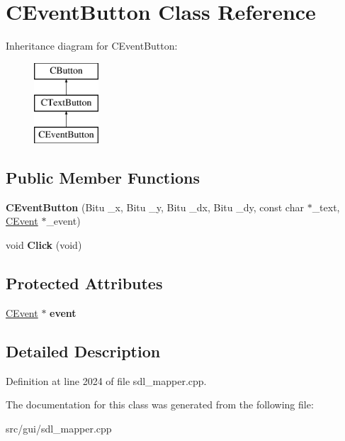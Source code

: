 \hypertarget{classCEventButton}{\section{C\-Event\-Button Class Reference}
\label{classCEventButton}
}
Inheritance diagram for C\-Event\-Button\-:\begin{figure}[H]
\begin{center}
\leavevmode
\includegraphics[height=3.000000cm]{classCEventButton}
\end{center}
\end{figure}
\subsection*{Public Member Functions}
\begin{DoxyCompactItemize}
\item 
\hypertarget{classCEventButton_a79fd3e96e7f7f1b3c4565f02535c3429}{{\bfseries C\-Event\-Button} (Bitu \-\_\-x, Bitu \-\_\-y, Bitu \-\_\-dx, Bitu \-\_\-dy, const char $\ast$\-\_\-text, \hyperlink{classCEvent}{C\-Event} $\ast$\-\_\-event)}\label{classCEventButton_a79fd3e96e7f7f1b3c4565f02535c3429}

\item 
\hypertarget{classCEventButton_ab88a51cd41e89b95cc7fbb7d78562fbe}{void {\bfseries Click} (void)}\label{classCEventButton_ab88a51cd41e89b95cc7fbb7d78562fbe}

\end{DoxyCompactItemize}
\subsection*{Protected Attributes}
\begin{DoxyCompactItemize}
\item 
\hypertarget{classCEventButton_a5f0d42f7b82112c4b144f84f308f1527}{\hyperlink{classCEvent}{C\-Event} $\ast$ {\bfseries event}}\label{classCEventButton_a5f0d42f7b82112c4b144f84f308f1527}

\end{DoxyCompactItemize}


\subsection{Detailed Description}


Definition at line 2024 of file sdl\-\_\-mapper.\-cpp.



The documentation for this class was generated from the following file\-:\begin{DoxyCompactItemize}
\item 
src/gui/sdl\-\_\-mapper.\-cpp\end{DoxyCompactItemize}
